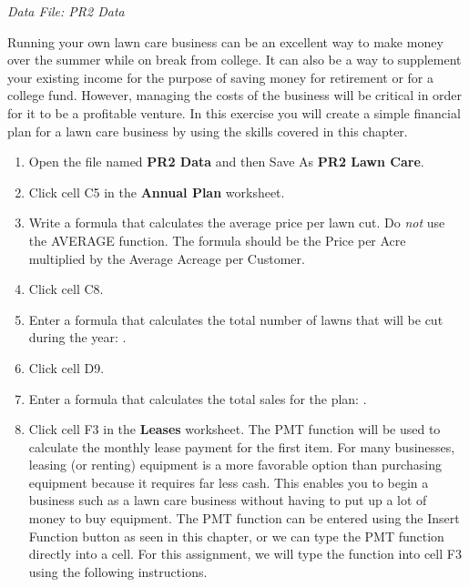 \textit{Data File: PR2 Data}

Running your own lawn care business can be an excellent way to make money over the summer while on break from college. It can also be a way to supplement your existing income for the purpose of saving money for retirement or for a college fund. However, managing the costs of the business will be critical in order for it to be a profitable venture. In this exercise you will create a simple financial plan for a lawn care business by using the skills covered in this chapter.

\begin{enumerate}
	\item Open the file named \textbf{PR2 Data} and then Save As \textbf{PR2 Lawn Care}.
	
	\item Click cell \textsf{C5} in the \textbf{Annual Plan} worksheet.

	\item Write a formula that calculates the average price per lawn cut. Do \textit{not} use the AVERAGE function. The formula should be the Price per Acre multiplied by the Average Acreage per Customer.
	
	\item Click cell \textsf{C8}.
	
	\item Enter a formula that calculates the total number of lawns that will be cut during the year: .
	
	\item Click cell \textsf{D9}.
	
	\item Enter a formula that calculates the total sales for the plan: .
	
	\item Click cell \textsf{F3} in the \textbf{Leases} worksheet. The PMT function will be used to calculate the monthly lease payment for the first item. For many businesses, leasing (or renting) equipment is a more favorable option than purchasing equipment because it requires far less cash. This enables you to begin a business such as a lawn care business without having to put up a lot of money to buy equipment. The PMT function can be entered using the Insert Function button as seen in this chapter, or we can type the PMT function directly into a cell. For this assignment, we will type the function into cell \textsf{F3} using the following instructions.
	

\end{enumerate}
